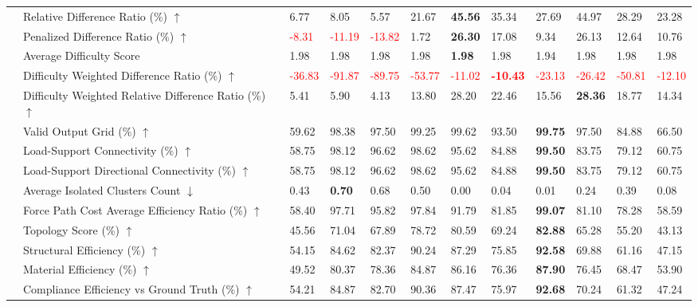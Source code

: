 \begin{table}[!h]
{\begin{tabular}{llllllllllll}
 & Relative Difference Ratio (\%) $\uparrow$ & 6.77 & 8.05 & 5.57 & 21.67 & \textbf{45.56} & 35.34 & 27.69 & 44.97 & 28.29 & 23.28 \\
 & Penalized Difference Ratio (\%) $\uparrow$ & \textcolor{red}{-8.31} & \textcolor{red}{-11.19} & \textcolor{red}{-13.82} & 1.72 & \textbf{26.30} & 17.08 & 9.34 & 26.13 & 12.64 & 10.76 \\
 & Average Difficulty Score & 1.98 & 1.98 & 1.98 & 1.98 & \textbf{1.98} & 1.98 & 1.94 & 1.98 & 1.98 & 1.98 \\
 & Difficulty Weighted Difference Ratio (\%) $\uparrow$ & \textcolor{red}{-36.83} & \textcolor{red}{-91.87} & \textcolor{red}{-89.75} & \textcolor{red}{-53.77} & \textcolor{red}{-11.02} & \textbf{\textcolor{red}{-10.43}} & \textcolor{red}{-23.13} & \textcolor{red}{-26.42} & \textcolor{red}{-50.81} & \textcolor{red}{-12.10} \\
 & Difficulty Weighted Relative Difference Ratio (\%) $\uparrow$ & 5.41 & 5.90 & 4.13 & 13.80 & 28.20 & 22.46 & 15.56 & \textbf{28.36} & 18.77 & 14.34 \\
 & Valid Output Grid (\%) $\uparrow$ & 59.62 & 98.38 & 97.50 & 99.25 & 99.62 & 93.50 & \textbf{99.75} & 97.50 & 84.88 & 66.50 \\
 & Load-Support Connectivity (\%) $\uparrow$ & 58.75 & 98.12 & 96.62 & 98.62 & 95.62 & 84.88 & \textbf{99.50} & 83.75 & 79.12 & 60.75 \\
 & Load-Support Directional Connectivity (\%) $\uparrow$ & 58.75 & 98.12 & 96.62 & 98.62 & 95.62 & 84.88 & \textbf{99.50} & 83.75 & 79.12 & 60.75 \\
 & Average Isolated Clusters Count $\downarrow$ & 0.43 & \textbf{0.70} & 0.68 & 0.50 & 0.00 & 0.04 & 0.01 & 0.24 & 0.39 & 0.08 \\
 & Force Path Cost Average Efficiency Ratio (\%) $\uparrow$ & 58.40 & 97.71 & 95.82 & 97.84 & 91.79 & 81.85 & \textbf{99.07} & 81.10 & 78.28 & 58.59 \\
 & Topology Score (\%) $\uparrow$ & 45.56 & 71.04 & 67.89 & 78.72 & 80.59 & 69.24 & \textbf{82.88} & 65.28 & 55.20 & 43.13 \\
 & Structural Efficiency (\%) $\uparrow$ & 54.15 & 84.62 & 82.37 & 90.24 & 87.29 & 75.85 & \textbf{92.58} & 69.88 & 61.16 & 47.15 \\
 & Material Efficiency (\%) $\uparrow$ & 49.52 & 80.37 & 78.36 & 84.87 & 86.16 & 76.36 & \textbf{87.90} & 76.45 & 68.47 & 53.90 \\
 & Compliance Efficiency vs Ground Truth (\%) $\uparrow$ & 54.21 & 84.87 & 82.70 & 90.36 & 87.47 & 75.97 & \textbf{92.68} & 70.24 & 61.32 & 47.24 \\

\end{tabular}}
\end{table}
